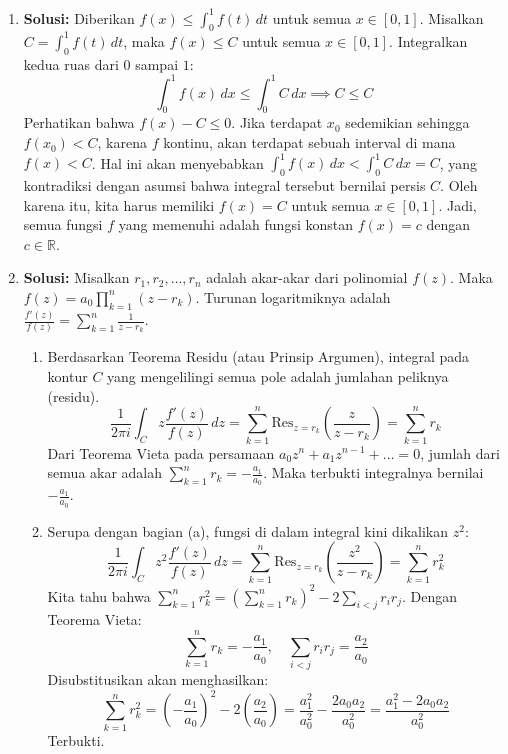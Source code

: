 \documentclass[11pt, a4paper]{article}
\begin{document}
\begin{enumerate}[leftmargin=*, label=\arabic*.]
  \item \textbf{Solusi:}
        Diberikan $f(x) \leq \int_0^1 f(t) \, dt$ untuk semua $x \in [0, 1]$.
        Misalkan $C = \int_0^1 f(t) \, dt$, maka $f(x) \leq C$ untuk semua $x \in [0, 1]$.
        Integralkan kedua ruas dari $0$ sampai $1$:
        \[ \int_0^1 f(x) \, dx \leq \int_0^1 C \, dx \implies C \leq C \]
        Perhatikan bahwa $f(x) - C \leq 0$. Jika terdapat $x_0$ sedemikian sehingga $f(x_0) < C$, karena $f$ kontinu, akan terdapat sebuah interval di mana $f(x) < C$.
        Hal ini akan menyebabkan $\int_0^1 f(x) \, dx < \int_0^1 C \, dx = C$, yang kontradiksi dengan asumsi bahwa integral tersebut bernilai persis $C$.
        Oleh karena itu, kita harus memiliki $f(x) = C$ untuk semua $x \in [0, 1]$. Jadi, semua fungsi $f$ yang memenuhi adalah fungsi konstan $f(x) = c$ dengan $c \in \mathbb{R}$.

  \item \textbf{Solusi:}
        Misalkan $r_1, r_2, \dots, r_n$ adalah akar-akar dari polinomial $f(z)$. Maka $f(z) = a_0 \prod_{k=1}^n (z - r_k)$.
        Turunan logaritmiknya adalah $\frac{f'(z)}{f(z)} = \sum_{k=1}^n \frac{1}{z - r_k}$.

        \begin{enumerate}[label=(\alph*)]
          \item Berdasarkan Teorema Residu (atau Prinsip Argumen), integral pada kontur $C$ yang mengelilingi semua pole adalah jumlahan peliknya (residu).
                \[ \frac{1}{2\pi i} \int_C z \frac{f'(z)}{f(z)} \, dz = \sum_{k=1}^n \text{Res}_{z=r_k} \left( \frac{z}{z - r_k} \right) = \sum_{k=1}^n r_k \]
                Dari Teorema Vieta pada persamaan $a_0z^n + a_1z^{n-1} + \dots = 0$, jumlah dari semua akar adalah $\sum_{k=1}^n r_k = -\frac{a_1}{a_0}$.
                Maka terbukti integralnya bernilai $-\frac{a_1}{a_0}$.

          \item Serupa dengan bagian (a), fungsi di dalam integral kini dikalikan $z^2$:
                \[ \frac{1}{2\pi i} \int_C z^2 \frac{f'(z)}{f(z)} \, dz = \sum_{k=1}^n \text{Res}_{z=r_k} \left( \frac{z^2}{z - r_k} \right) = \sum_{k=1}^n r_k^2 \]
                Kita tahu bahwa $\sum_{k=1}^n r_k^2 = \left(\sum_{k=1}^n r_k\right)^2 - 2\sum_{i<j} r_i r_j$.
                Dengan Teorema Vieta:
                \[ \sum_{k=1}^n r_k = -\frac{a_1}{a_0}, \quad \sum_{i<j} r_i r_j = \frac{a_2}{a_0} \]
                Disubstitusikan akan menghasilkan:
                \[ \sum_{k=1}^n r_k^2 = \left(-\frac{a_1}{a_0}\right)^2 - 2 \left(\frac{a_2}{a_0}\right) = \frac{a_1^2}{a_0^2} - \frac{2a_0a_2}{a_0^2} = \frac{a_1^2 - 2a_0a_2}{a_0^2} \]
                Terbukti.
        \end{enumerate}


\end{enumerate}
\end{document}
